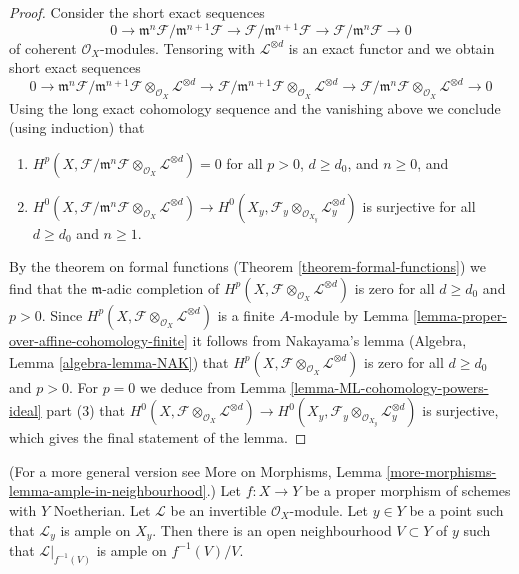 \begin{proof}
\medskip\noindent
Consider the short exact sequences
$$
0 \to \mathfrak m^n\mathcal{F}/\mathfrak m^{n + 1} \mathcal{F}
\to \mathcal{F}/\mathfrak m^{n + 1} \mathcal{F}
\to \mathcal{F}/\mathfrak m^n \mathcal{F} \to 0
$$
of coherent $\mathcal{O}_X$-modules. Tensoring with $\mathcal{L}^{\otimes d}$
is an exact functor and we obtain short exact sequences
$$
0 \to
\mathfrak m^n\mathcal{F}/\mathfrak m^{n + 1} \mathcal{F}
\otimes_{\mathcal{O}_X} \mathcal{L}^{\otimes d}
\to \mathcal{F}/\mathfrak m^{n + 1} \mathcal{F}
\otimes_{\mathcal{O}_X} \mathcal{L}^{\otimes d}
\to \mathcal{F}/\mathfrak m^n \mathcal{F}
\otimes_{\mathcal{O}_X} \mathcal{L}^{\otimes d} \to 0
$$
Using the long exact cohomology sequence and the vanishing above
we conclude (using induction) that
\begin{enumerate}
\item $H^p(X, \mathcal{F}/\mathfrak m^n \mathcal{F}
\otimes_{\mathcal{O}_X} \mathcal{L}^{\otimes d}) = 0$
for all $p > 0$, $d \geq d_0$, and $n \geq 0$, and
\item $H^0(X, \mathcal{F}/\mathfrak m^n \mathcal{F}
\otimes_{\mathcal{O}_X} \mathcal{L}^{\otimes d}) \to
H^0(X_y, \mathcal{F}_y \otimes_{\mathcal{O}_{X_y}} \mathcal{L}_y^{\otimes d})$
is surjective for all $d \geq d_0$ and $n \geq 1$.
\end{enumerate}
By the theorem on formal functions (Theorem \ref{theorem-formal-functions})
we find that the $\mathfrak m$-adic completion of
$H^p(X, \mathcal{F} \otimes_{\mathcal{O}_X} \mathcal{L}^{\otimes d})$
is zero for all $d \geq d_0$ and $p > 0$.
Since $H^p(X, \mathcal{F} \otimes_{\mathcal{O}_X} \mathcal{L}^{\otimes d})$
is a finite $A$-module by
Lemma \ref{lemma-proper-over-affine-cohomology-finite}
it follows from Nakayama's lemma (Algebra, Lemma \ref{algebra-lemma-NAK})
that $H^p(X, \mathcal{F} \otimes_{\mathcal{O}_X} \mathcal{L}^{\otimes d})$
is zero for all $d \geq d_0$ and $p > 0$.
For $p = 0$ we deduce from
Lemma \ref{lemma-ML-cohomology-powers-ideal} part (3)
that $H^0(X, \mathcal{F} \otimes_{\mathcal{O}_X} \mathcal{L}^{\otimes d}) \to
H^0(X_y, \mathcal{F}_y \otimes_{\mathcal{O}_{X_y}} \mathcal{L}_y^{\otimes d})$
is surjective, which gives the final statement of the lemma.
\end{proof}

\begin{lemma}
\label{lemma-ample-in-neighbourhood}
(For a more general version see
More on Morphisms,
Lemma \ref{more-morphisms-lemma-ample-in-neighbourhood}.)
Let $f : X \to Y$ be a proper morphism of schemes with $Y$ Noetherian.
Let $\mathcal{L}$ be an invertible $\mathcal{O}_X$-module.
Let $y \in Y$ be a point such that $\mathcal{L}_y$ is ample
on $X_y$. Then there is an open neighbourhood $V \subset Y$
of $y$ such that $\mathcal{L}|_{f^{-1}(V)}$ is ample on $f^{-1}(V)/V$.
\end{lemma}

